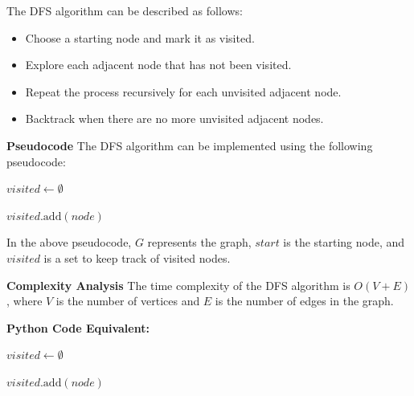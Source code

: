 \documentclass[12pt]{book} %
\begin{document}
The DFS algorithm can be described as follows:
\FloatBarrier
\begin{itemize}
    \item Choose a starting node and mark it as visited.
    \item Explore each adjacent node that has not been visited.
    \item Repeat the process recursively for each unvisited adjacent node.
    \item Backtrack when there are no more unvisited adjacent nodes.
\end{itemize}
\FloatBarrier
\textbf{Pseudocode}
\FloatBarrier
The DFS algorithm can be implemented using the following pseudocode:
\FloatBarrier
\begin{algorithm}
\caption{Depth First Search (DFS)}
\begin{algorithmic}[1]
    \State $visited \gets \emptyset$
    \State {}
\EndFunction

    \State $visited.\text{add}(node)$
            \State {}
        \EndIf
    \EndFor
\EndFunction
\end{algorithmic}
\end{algorithm}
\FloatBarrier
In the above pseudocode, $G$ represents the graph, $start$ is the starting node, and $visited$ is a set to keep track of visited nodes.
\FloatBarrier

\textbf{Complexity Analysis}
\FloatBarrier
The time complexity of the DFS algorithm is $O(V + E)$, where $V$ is the number of vertices and $E$ is the number of edges in the graph.

\FloatBarrier
\textbf{Python Code Equivalent:}
\FloatBarrier
\begin{algorithm}
\caption{Depth First Search (DFS)}
\begin{algorithmic}[1]
    \State $visited \gets \emptyset$
    \State {}
\EndFunction

    \State $visited.\text{add}(node)$
            \State {}
        \EndIf
    \EndFor
\EndFunction
\end{algorithmic}
\end{algorithm}
\FloatBarrier
\end{document}

